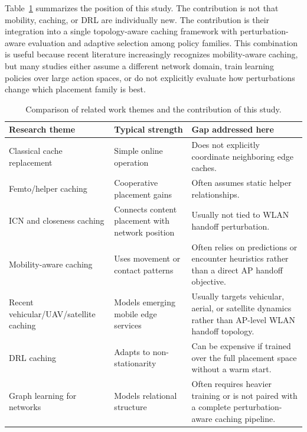 Table~\ref{tab:related_comparison} summarizes the position of this study. The contribution is not that mobility, caching, or DRL are individually new. The contribution is their integration into a single topology-aware caching framework with perturbation-aware evaluation and adaptive selection among policy families. This combination is useful because recent literature increasingly recognizes mobility-aware caching, but many studies either assume a different network domain, train learning policies over large action spaces, or do not explicitly evaluate how perturbations change which placement family is best.

\begin{table}[t]
\centering
\caption{Comparison of related work themes and the contribution of this study.}
\label{tab:related_comparison}
\begin{tabular}{p{}p{}p{}}
\toprule
Research theme & Typical strength & Gap addressed here \\
\midrule
Classical cache replacement \cite{Podlipnig2003} & Simple online operation & Does not explicitly coordinate neighboring edge caches. \\
Femto/helper caching \cite{Shanmugam2013,Golrezaei2014JSAC} & Cooperative placement gains & Often assumes static helper relationships. \\
ICN and closeness caching \cite{Zhang2014NDN,Amadeo2022} & Connects content placement with network position & Usually not tied to WLAN handoff perturbation. \\
Mobility-aware caching \cite{Wang2017Mobility,Mardham2018} & Uses movement or contact patterns & Often relies on predictions or encounter heuristics rather than a direct AP handoff objective. \\
Recent vehicular/UAV/satellite caching \cite{bai2025collaborative,xu2026cooperative,ma2025delay,cao2025,zhao2026collaborative} & Models emerging mobile edge services & Usually targets vehicular, aerial, or satellite dynamics rather than AP-level WLAN handoff topology. \\
DRL caching \cite{mnih2015dqn,Min2020MARL,jiang2026cooperative} & Adapts to non-stationarity & Can be expensive if trained over the full placement space without a warm start. \\
Graph learning for networks \cite{Rusek2019,Jiang2022Survey,wang2024knowledge} & Models relational structure & Often requires heavier training or is not paired with a complete perturbation-aware caching pipeline. \\
\bottomrule
\end{tabular}
\end{table}
